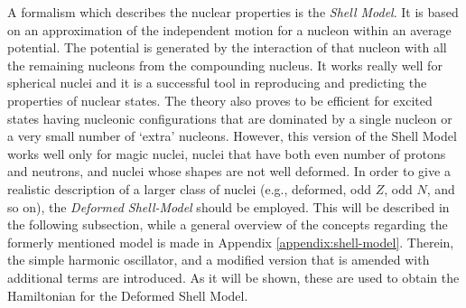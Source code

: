 A formalism which describes the nuclear properties is the \emph{Shell Model}. It is based on an approximation of the independent motion for a nucleon within an average potential. The potential is generated by the interaction of that nucleon with all the remaining nucleons from the compounding nucleus. It works really well for spherical nuclei and it is a successful tool in reproducing and predicting the properties of nuclear states. The theory also proves to be efficient for excited states having nucleonic configurations that are dominated by a single nucleon or a very small number of `extra' nucleons. However, this version of the Shell Model works well only for magic nuclei, nuclei that have both even number of protons and neutrons, and nuclei whose shapes are not well deformed. In order to give a realistic description of a larger class of nuclei (e.g., deformed, odd $Z$, odd $N$, and so on), the \emph{Deformed Shell-Model} should be employed. This will be described in the following subsection, while a general overview of the concepts regarding the formerly mentioned model is made in Appendix \ref{appendix:shell-model}. Therein, the simple harmonic oscillator, and a modified version that is amended with additional terms are introduced. As it will be shown, these are used to obtain the Hamiltonian for the Deformed Shell Model.



